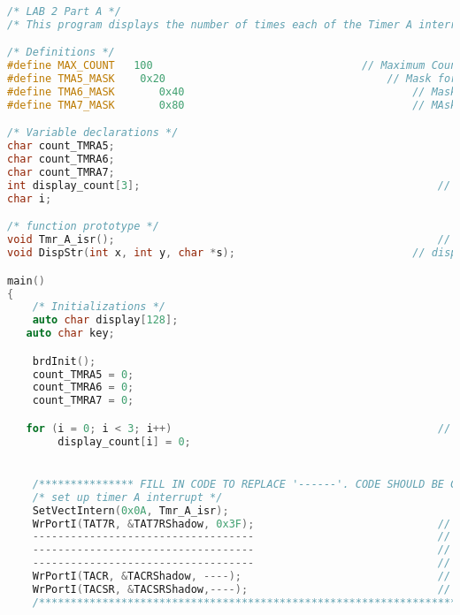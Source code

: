 \begin{lstlisting}[language=C++]
/* LAB 2 Part A */
/* This program displays the number of times each of the Timer A interrupts have occured on the computer monitor */

/* Definitions */
#define	MAX_COUNT	100									// Maximum Count Value
#define TMA5_MASK    0x20									// Mask for Timer A5 in TACSR
#define TMA6_MASK		0x40									// Mask for Timer A6 in TACSR
#define TMA7_MASK		0x80									// MAsk for Timer A7 in TACSR

/* Variable declarations */
char count_TMRA5;														// This variable will count the number of times Timer A5 has triggered an interrupted
char count_TMRA6;														// This variable will count the number of times Timer A6 has triggered an interrupted
char count_TMRA7;														// This variable will count the number of times Timer A7 has triggered an interrupted
int display_count[3];												// This variable will hold the count values divided by 100
char i;																	// iterator

/* function prototype */
void Tmr_A_isr(); 													// Timer A interrupt service routine
void DispStr(int x, int y, char *s);							// display strings on computer monitor

main()
{
	/* Initializations */
	auto char display[128];
   auto char key;

	brdInit();
	count_TMRA5 = 0;													// initialize counters to zero
	count_TMRA6 = 0;													// initialize counters to zero
	count_TMRA7 = 0;													// initialize counters to zero

   for (i = 0; i < 3; i++)											// initialize display counters to zero
		display_count[i] = 0;


	/*************** FILL IN CODE TO REPLACE '------'. CODE SHOULD BE CONSISTENT WITH COMMENTS. REFER TO FIGURE 5. IN LAB MANUAL. *******************/
	/* set up timer A interrupt */
	SetVectIntern(0x0A, Tmr_A_isr); 									// set up timer A interrupt vector
	WrPortI(TAT7R, &TAT7RShadow, 0x3F);								// set TMRA7 to count down from 63
  	-----------------------------------								// set TMRA6 to count down from 127
	-----------------------------------								// set TMRA5 to count down from 255
	-----------------------------------								// set TMRA1 to count down from 255
	WrPortI(TACR, &TACRShadow, ----);								// Clock TMRA5,TMRA6,TMRA7 by TMRA1. Clock TMRA4 by PCLK/2. Set Timer A to trigger priority 1 interrupts
	WrPortI(TACSR, &TACSRShadow,----); 								// Enable interrupts for TMRA5,TMRA6,TMRA7 only. Enable main clock for Timer A
	/************************************************************************************************************************************************/



\end{lstlisting}
